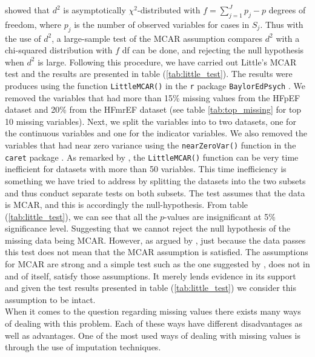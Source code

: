 \documentclass[../thesis.tex]{subfiles}
\begin{document}
\noindent \cite{little1988test} showed that $d^2$ is asymptotically $\chi^2$-distributed with $f = \sum_{j=1}^J p_j - p$ degrees of freedom, where $p_j$ is the number of observed variables for cases in $S_j$. Thus with the use of $d^2$, a large-sample test of the MCAR assumption compares $d^2$ with a chi-squared distribution with $f$ df can be done, and rejecting the null hypothesis when $d^2$ is large. Following this procedure, we have carried out Little's MCAR test and the results are presented in table (\ref{tab:little_test}). The results were produces using the function \texttt{LittleMCAR()} in the \texttt{r} package \texttt{BaylorEdPsych} \citep{BaylorEdPsych}. We removed the variables that had more than 15\% missing values from the HFpEF dataset and 20\% from the HFmrEF dataset (see table \ref{tab:top_missing} for top 10 missing variables). Next, we split the variables into to two datasets, one for the continuous variables and one for the indicator variables. We also removed the variables that had near zero variance using the \texttt{nearZeroVar()} function in the \texttt{caret} package \citep{kuhncaret}. As remarked by \cite{BaylorEdPsych}, the \texttt{LittleMCAR()} function can be very time inefficient for datasets with more than 50 variables. This time inefficiency is something we have tried to address by splitting the datasets into the two subsets and thus conduct separate tests on both subsets. The test assumes that the data is MCAR, and this is accordingly the null-hypothesis. From table (\ref{tab:little_test}), we can see that all the $p$-values are insignificant at 5\% significance level. Suggesting that we cannot reject the null hypothesis of the missing data being MCAR. However, as argued by \cite{allison1999missing}, just because the data passes this test does not mean that the MCAR assumption is satisfied. The assumptions for MCAR are strong and a simple test such as the one suggested by \cite{little1988test}, does not in and of itself, satisfy those assumptions. It merely lends evidence in its support and given the test results presented in table (\ref{tab:little_test}) we consider this assumption to be intact.\\
\indent When it comes to the question regarding missing values there exists many ways of dealing with this problem. Each of these ways have different disadvantages as well as advantages. One of the most used ways of dealing with missing values is through the use of imputation techniques. 


\end{document}
